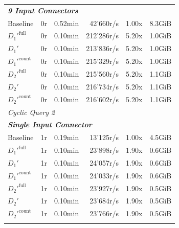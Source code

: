 \begin{longtable}{lrrrrr}
    \multicolumn{6}{l}{\textit{\textbf{9 Input Connectors}}} \\
    \nopagebreak
    Baseline              &  0r                   &  0.52min            &  42'660r/s           & 1.00x             & 8.3GiB    \\
    $D_1'^{\text{full}}$   &  0r                   &  0.10min            &  212'286r/s          & 5.20x             & 1.0GiB    \\
    \quad $D_1'$           &  0r                   &  0.10min            &  213'836r/s          & 5.20x             & 1.0GiB    \\
    $D_1'^{\text{count}}$  &  0r                   &  0.10min            &  215'329r/s          & 5.20x             & 1.0GiB    \\
    $D_2'^{\text{full}}$   &  0r                   &  0.10min            &  215'560r/s          & 5.20x             & 1.1GiB    \\
    \quad $D_2'$           &  0r                   &  0.10min            &  216'734r/s          & 5.20x             & 1.1GiB    \\
    $D_2'^{\text{count}}$   &  0r                   &  0.10min            &  216'602r/s          & 5.20x             & 1.1GiB    \\
    \midrule


    \multicolumn{6}{l}{\textit{Cyclic Query 2}} \\
    \midrule
    \multicolumn{6}{l}{\textit{\textbf{Single Input Connector}}} \\
    \nopagebreak
    Baseline              &  1r                   &  0.19min            &  13'125r/s           & 1.00x             & 4.5GiB    \\
    $D_1'^{\text{full}}$   &  1r                   &  0.10min            &  23'898r/s           & 1.90x             & 0.6GiB    \\
    \quad $D_1'$           &  1r                   &  0.10min            &  24'057r/s           & 1.90x             & 0.6GiB    \\
    $D_1'^{\text{count}}$  &  1r                   &  0.10min            &  24'033r/s           & 1.90x             & 0.6GiB    \\
    $D_2'^{\text{full}}$   &  1r                   &  0.10min            &  23'927r/s           & 1.90x             & 0.5GiB    \\
    \quad $D_2'$           &  1r                   &  0.10min            &  23'684r/s           & 1.90x             & 0.5GiB    \\
    $D_2'^{\text{count}}$  &  1r                   &  0.10min            &  23'766r/s           & 1.90x             & 0.5GiB    \\
    \addlinespace
    

\end{longtable}
